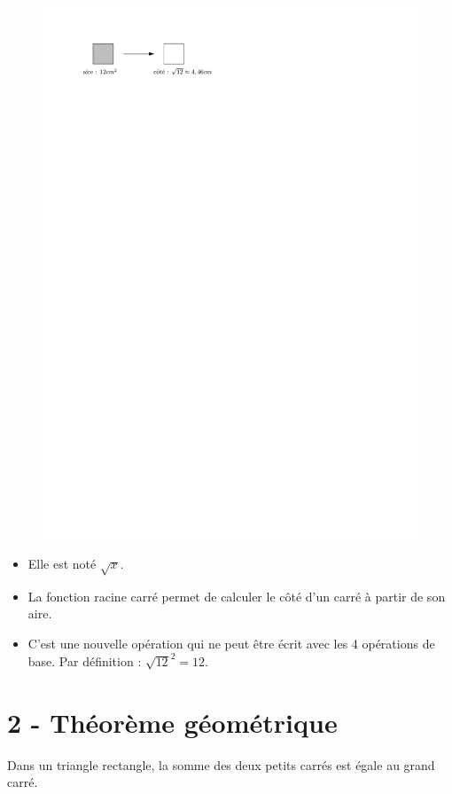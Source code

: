 \documentclass[12pt]{article}
\begin{document}
\begin{multicols}{2}
  \begin{figure}[H]
        \centering
        \includegraphics[width=0.8\linewidth]{3x6-pythagore/sources/fonction-racine.pdf}
  \end{figure}

\begin{itemize}
\item Elle est noté $\sqrt{x}$. 
\item La fonction racine carré permet de calculer le côté d'un carré à partir de son aire.
\item C'est une nouvelle opération qui ne peut être écrit avec les 4 opérations de base. Par définition : $\sqrt{12}^2 = 12$.
\end{itemize}

\end{multicols}

\section*{2 - Théorème géométrique}

Dans un triangle rectangle, la somme des deux petits carrés est égale au grand carré.
\end{document}
